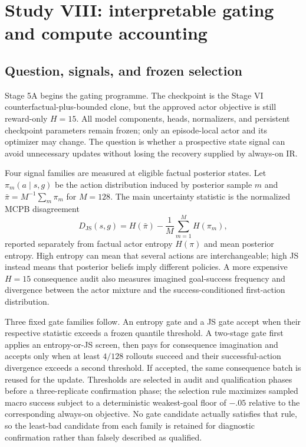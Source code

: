 \documentclass[10pt]{article}
\begin{document}
\section{Study VIII: interpretable gating and compute accounting}

\subsection{Question, signals, and frozen selection}

Stage 5A begins the gating programme. The checkpoint is the Stage VI
counterfactual-plus-bounded clone, but the approved actor objective is still
reward-only $H=15$. All model components, heads, normalizers, and persistent
checkpoint parameters remain frozen; only an episode-local actor and its
optimizer may change. The question is whether a prospective state signal can
avoid unnecessary updates without losing the recovery supplied by always-on
IR.

Four signal families are measured at eligible factual posterior states. Let
$\pi_m(a\mid s,g)$ be the action distribution induced by posterior sample $m$
and $\bar\pi=M^{-1}\sum_m\pi_m$ for $M=128$. The main uncertainty statistic is
the normalized MCPB disagreement
\begin{equation}
 D_{\mathrm{JS}}(s,g)=
 H(\bar\pi)-\frac{1}{M}\sum_{m=1}^{M}H(\pi_m),
\end{equation}
reported separately from factual actor entropy $H(\pi)$ and mean posterior
entropy. High entropy can mean that several actions are interchangeable;
high JS instead means that posterior beliefs imply different policies. A more
expensive $H=15$ consequence audit also measures imagined goal-success
frequency and divergence between the actor mixture and the
success-conditioned first-action distribution.

Three fixed gate families follow. An entropy gate and a JS gate accept when
their respective statistic exceeds a frozen quantile threshold. A two-stage
gate first applies an entropy-or-JS screen, then pays for consequence
imagination and accepts only when at least $4/128$ rollouts succeed and their
successful-action divergence exceeds a second threshold. If accepted, the
same consequence batch is reused for the update. Thresholds are selected in
audit and qualification phases before a three-replicate confirmation phase;
the selection rule maximizes sampled macro success subject to a deterministic
weakest-goal floor of $-.05$ relative to the corresponding always-on
objective. No gate candidate actually satisfies that rule, so the least-bad
candidate from each family is retained for diagnostic confirmation rather
than falsely described as qualified.
\end{document}
